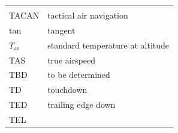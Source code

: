 \documentclass[
]{book}
\begin{document}
\begin{longtable}[]{@{}ll@{}}
\begin{minipage}[t]{0.47\columnwidth}
\end{minipage}\tabularnewline
\begin{minipage}[t]{0.47\columnwidth}\raggedright
TACAN\strut
\end{minipage} & \begin{minipage}[t]{0.47\columnwidth}\raggedright
tactical air navigation\strut
\end{minipage}\tabularnewline
\begin{minipage}[t]{0.47\columnwidth}\raggedright
tan\strut
\end{minipage} & \begin{minipage}[t]{0.47\columnwidth}\raggedright
tangent\strut
\end{minipage}\tabularnewline
\begin{minipage}[t]{0.47\columnwidth}\raggedright
\(T_{\mathrm{as}}\)\strut
\end{minipage} & \begin{minipage}[t]{0.47\columnwidth}\raggedright
standard temperature at altitude\strut
\end{minipage}\tabularnewline
\begin{minipage}[t]{0.47\columnwidth}\raggedright
TAS\strut
\end{minipage} & \begin{minipage}[t]{0.47\columnwidth}\raggedright
true airspeed\strut
\end{minipage}\tabularnewline
\begin{minipage}[t]{0.47\columnwidth}\raggedright
TBD\strut
\end{minipage} & \begin{minipage}[t]{0.47\columnwidth}\raggedright
to be determined\strut
\end{minipage}\tabularnewline
\begin{minipage}[t]{0.47\columnwidth}\raggedright
TD\strut
\end{minipage} & \begin{minipage}[t]{0.47\columnwidth}\raggedright
touchdown\strut
\end{minipage}\tabularnewline
\begin{minipage}[t]{0.47\columnwidth}\raggedright
TED\strut
\end{minipage} & \begin{minipage}[t]{0.47\columnwidth}\raggedright
trailing edge down\strut
\end{minipage}\tabularnewline
\begin{minipage}[t]{0.47\columnwidth}\raggedright
TEL\strut
\end{minipage} & \begin{minipage}[t]{0.47\columnwidth}\raggedright

\end{minipage}
\end{longtable}
\end{document}
